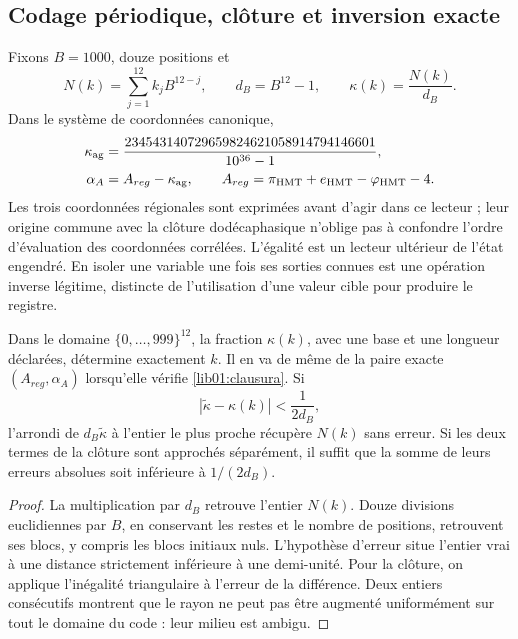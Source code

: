 \subsection{Codage périodique, clôture et inversion exacte}
\label{lib01:kappa}

Fixons \(B=1000\), douze positions et
\[
 N(k)=\sum_{j=1}^{12}k_jB^{12-j},\qquad d_B=B^{12}-1,
 \qquad \kappa(k)=\frac{N(k)}{d_B}.
\]
Dans le système de coordonnées canonique,
\begin{equation}
 \begin{aligned}
 \kappa_{\rm ag}
 &=\frac{234543140729659824621058914794146601}{10^{36}-1},\\
 \alpha_A&=A_{reg}-\kappa_{\rm ag},\qquad
 A_{reg}=\pi_{\rm HMT}+e_{\rm HMT}-\varphi_{\rm HMT}-4.
 \end{aligned}
 \label{lib01:clausura}
\end{equation}
Les trois coordonnées régionales sont exprimées avant d’agir dans ce lecteur ;
leur origine commune avec la clôture dodécaphasique n’oblige pas à confondre l’ordre
d’évaluation des coordonnées corrélées. L’égalité est un lecteur
ultérieur de l’état engendré. En isoler une variable une fois ses sorties connues est
une opération inverse légitime, distincte de l’utilisation d’une valeur cible pour
produire le registre.

\begin{proposition}
\label{lib01:inversion-kappa}
Dans le domaine \(\{0,\ldots,999\}^{12}\), la fraction \(\kappa(k)\),
avec une base et une longueur déclarées, détermine exactement \(k\). Il en va de même
de la paire exacte \((A_{reg},\alpha_A)\) lorsqu’elle vérifie
\eqref{lib01:clausura}. Si
\[
 |\widetilde\kappa-\kappa(k)|<\frac1{2d_B},
\]
l'arrondi de \(d_B\widetilde\kappa\) à l'entier le plus proche récupère \(N(k)\) sans erreur. Si les deux termes de la clôture sont approchés séparément, il suffit que la somme de leurs erreurs absolues soit inférieure à \(1/(2d_B)\).
\end{proposition}
\begin{proof}
La multiplication par \(d_B\) retrouve l’entier \(N(k)\).
Douze divisions euclidiennes par \(B\), en conservant les restes et le nombre
de positions, retrouvent ses blocs, y compris les blocs initiaux nuls.
L’hypothèse d’erreur situe l’entier vrai à une distance strictement
inférieure à une demi-unité. Pour la clôture, on applique l’inégalité
triangulaire à l’erreur de la différence. Deux entiers consécutifs montrent
que le rayon ne peut pas être augmenté uniformément sur tout le domaine du
code : leur milieu est ambigu.
\end{proof}

